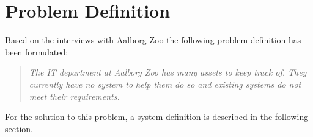 



\section{Problem Definition}
Based on the interviews with Aalborg Zoo the following problem definition has been formulated:
\begin{quote}
\textit{The IT department at Aalborg Zoo has many assets to keep track of. They currently have no system to help them do so and existing systems do not meet their requirements.}
\end{quote}
For the solution to this problem, a system definition is described in the following section.